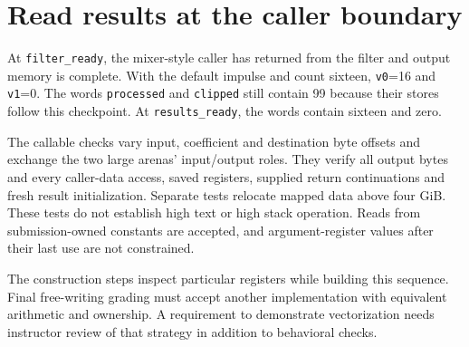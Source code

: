 \section{Read results at the caller boundary}
At \texttt{filter\_ready}, the mixer-style caller has returned from the filter and
output memory is complete. With the default impulse and count sixteen,
\texttt{v0}=16 and \texttt{v1}=0. The words \texttt{processed} and \texttt{clipped}
still contain 99 because their stores follow this checkpoint. At
\texttt{results\_ready}, the words contain sixteen and zero.

The callable checks vary input, coefficient and destination byte offsets and exchange
the two large arenas' input/output roles. They verify all output bytes and every
caller-data access, saved registers, supplied return continuations and fresh result
initialization. Separate tests relocate mapped data above four GiB. These tests do
not establish high text or high stack operation. Reads from submission-owned constants
are accepted, and argument-register values after their last use are not constrained.

The construction steps inspect particular registers while building this sequence.
Final free-writing grading must accept another implementation with equivalent arithmetic
and ownership. A requirement to demonstrate vectorization needs instructor review of
that strategy in addition to behavioral checks.
